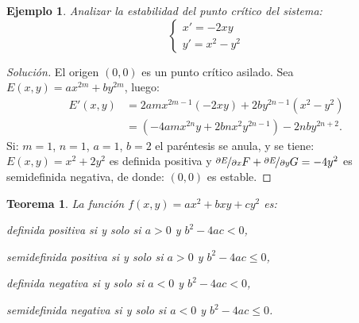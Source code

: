 \documentclass[a5paper,doc,10pt,noapacite]{apa6}
\newtheorem{teorema}{Teorema}
\newtheorem{ejem}{Ejemplo}
\begin{document}
{{\begin{ejem}
	Analizar la estabilidad del punto crítico del sistema:
	\[
	\begin{cases}
		x'=-2xy
		\\
		y'=x^2-y^2
	\end{cases}
	\]
\end{ejem}
	\begin{proof}[Solución]
		El origen \((0,0)\) es un punto crítico asilado. Sea \(E(x,y)=ax^{2m}+by^{2m}\), luego:
		\begin{align*}
			E'(x,y)&=2amx^{2m-1}(-2xy)+2by^{2n-1}(x^2-y^2)\\
				&=\left(-4amx^{2n}y+2bnx^2y^{2n-1}\right)-2nby^{2n+2} .
		\end{align*}
		Si: \(m=1\), \(n=1\), \(a=1\), \(b=2\) el paréntesis se anula, y se tiene: \(E(x,y)=x^2+2y^2\) es definida positiva y \(\nicefrac{\partial E}{\partial x}F+\nicefrac{\partial E}{\partial y}G=-4y^2\) es semidefinida negativa, de donde: \((0,0)\) es estable.
	\end{proof}



\begin{teorema}
	La función \(f(x,y)=ax^2+bxy+cy^2\) es:
	\begin{APAitemize}
		\item definida positiva si y solo si  \(a>0\) y \(b^2-4ac<0\),
		\item semidefinida positiva si y solo si \(a>0\) y \(b^2-4ac\leq 0\),
		\item definida negativa si y solo si \(a<0\) y \(b^2-4ac<0\),
		\item semidefinida negativa si y solo si \(a<0\) y \(b^2-4ac\leq 0\).
	\end{APAitemize}
\end{teorema}



%
%
%
}}
\end{document}
